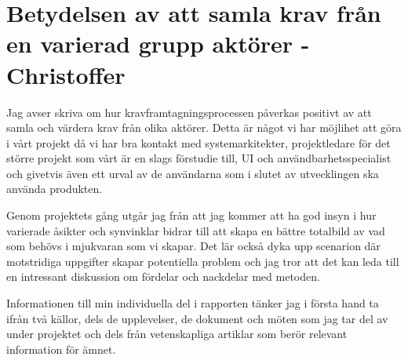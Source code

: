 \section{Betydelsen av att samla krav från en varierad grupp aktörer - Christoffer}

Jag avser skriva om hur kravframtagningsprocessen påverkas positivt av att samla och värdera krav från olika aktörer. Detta är något vi har möjlihet att göra i vårt projekt då vi har bra kontakt med systemarkitekter, projektledare för det större projekt som vårt är en slags förstudie till, UI och användbarhetsspecialist och givetvis även ett urval av de användarna som i slutet av utvecklingen ska använda produkten.

Genom projektets gång utgår jag från att jag kommer att ha god insyn i hur varierade åsikter och synvinklar bidrar till att skapa en bättre totalbild av vad som behövs i mjukvaran som vi skapar. Det lär också dyka upp scenarion där motstridiga uppgifter skapar potentiella problem och jag tror att det kan leda till en intressant diskussion om fördelar och nackdelar med metoden.

Informationen till min individuella del i rapporten tänker jag i första hand ta ifrån två källor, dels de upplevelser, de dokument och möten som jag tar del av under projektet och dels från vetenskapliga artiklar som berör relevant information för ämnet.
